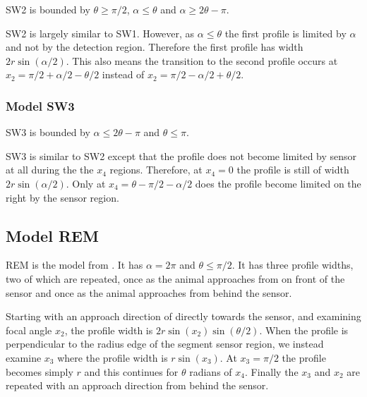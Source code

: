 SW2 is bounded by $\theta \ge \pi/2$, $\alpha \le \theta$ and $\alpha \ge 2\theta -\pi$.

SW2 is largely similar to SW1. However, as $\alpha \le \theta$ the first profile is limited by $\alpha$ and not by the detection region. Therefore the first profile has width $2r\sin(\alpha /2)$. This also means the transition to the second profile occurs at  $x_2 = \pi/2 + \alpha/2 - \theta/2$ instead of  $x_2 = \pi/2 - \alpha/2 + \theta/2$.





\subsubsection{Model SW3} \label{SW3}

SW3 is bounded by $\alpha \le 2\theta -\pi$ and $\theta \le \pi$.

SW3 is similar to SW2 except that the profile does not become limited by sensor at all during the the $x_4$ regions. Therefore, at $x_4 = 0 $ the profile is still of width $2r\sin(\alpha /2)$. Only at $x_4 = \theta - \pi/2 - \alpha/2$ does the profile become limited on the right by the sensor region.



\subsection{Model REM} \label{REM}

REM is the model from \citep{rowcliffe2008estimating}. It has $\alpha =2\pi$ and $\theta \le \pi/2$. It has three profile widths, two of which are repeated, once as the animal approaches from on front of the sensor and once as the animal approaches from behind the sensor.

Starting with an approach direction of directly towards the sensor, and examining focal angle $x_2$, the profile width is $2r\sin(x_2)\sin(\theta/2)$. When the profile is perpendicular to the radius edge of the segment sensor region, we instead examine $x_3$ where the profile width is $r\sin(x_3)$. At $x_3=\pi/2$ the profile becomes simply $r$ and this continues for $\theta $ radians of $x_4$. Finally the $x_3$ and $x_2$ are repeated with an approach direction from behind the sensor. 

